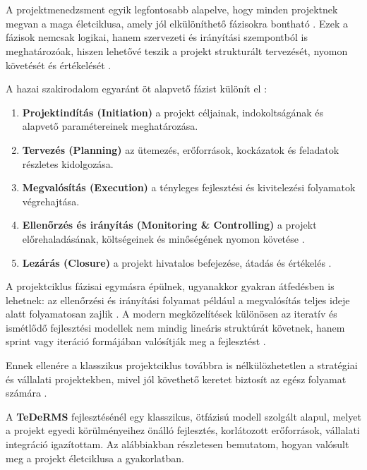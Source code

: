 \chapter{\projectlifecycle}

A projektmenedzsment egyik legfontosabb alapelve, hogy minden projektnek megvan a maga életciklusa, 
amely jól elkülöníthető fázisokra bontható \cite{Hajdu2014,Szalay2018}. 
Ezek a fázisok nemcsak logikai, hanem szervezeti és irányítási szempontból is meghatározóak, 
hiszen lehetővé teszik a projekt strukturált tervezését, nyomon követését és értékelését \cite{Hajdu2014}. 

A hazai szakirodalom egyaránt öt alapvető fázist különít el \cite{Szalay2018,Hajdu2014}:

\begin{enumerate}
    \item \textbf{Projektindítás (Initiation)} a projekt céljainak, indokoltságának és alapvető paramétereinek meghatározása.
    \item \textbf{Tervezés (Planning)} az ütemezés, erőforrások, kockázatok és feladatok részletes kidolgozása.
    \item \textbf{Megvalósítás (Execution)} a tényleges fejlesztési és kivitelezési folyamatok végrehajtása.
    \item \textbf{Ellenőrzés és irányítás (Monitoring \& Controlling)} a projekt előrehaladásának, költségeinek és minőségének nyomon követése \cite{Hajdu2014}.
    \item \textbf{Lezárás (Closure)} a projekt hivatalos befejezése, átadás és értékelés \cite{Szalay2018}.
\end{enumerate}

A projektciklus fázisai egymásra épülnek, ugyanakkor gyakran átfedésben is lehetnek: 
az ellenőrzési és irányítási folyamat például a megvalósítás teljes ideje alatt folyamatosan zajlik \cite{Hajdu2014}.  
A modern megközelítések különösen az iteratív és ismétlődő fejlesztési modellek nem mindig lineáris struktúrát követnek, 
hanem sprint vagy iteráció formájában valósítják meg a fejlesztést \cite{Szalay2018}.  

Ennek ellenére a klasszikus projektciklus továbbra is nélkülözhetetlen a stratégiai és vállalati projektekben, 
mivel jól követhető keretet biztosít az egész folyamat számára \cite{Hajdu2014}.  

A \textbf{TeDeRMS} fejlesztésénél egy klasszikus, ötfázisú modell szolgált alapul, 
melyet a projekt egyedi körülményeihez önálló fejlesztés, korlátozott erőforrások, vállalati integráció igazítottam.  
Az alábbiakban részletesen bemutatom, hogyan valósult meg a projekt életciklusa a gyakorlatban.


